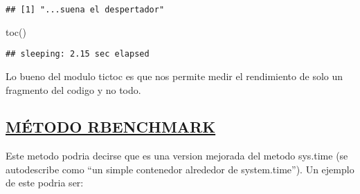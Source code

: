 \documentclass[preprint, 3p,
authoryear]{elsarticle} %
\newenvironment{Shaded}{\begin{snugshade}}{\end{snugshade}}
\newcommand{\FunctionTok}[1]{\textcolor[rgb]{0.00,0.00,0.00}{#1}}
\newcommand{\NormalTok}[1]{#1}
\begin{document}
\begin{verbatim}
## [1] "...suena el despertador"
\end{verbatim}

\begin{Shaded}
\begin{Highlighting}[]
\FunctionTok{toc}\NormalTok{()}
\end{Highlighting}
\end{Shaded}

\begin{verbatim}
## sleeping: 2.15 sec elapsed
\end{verbatim}

Lo bueno del modulo tictoc es que nos permite medir el rendimiento de
solo un fragmento del codigo y no todo.

\hypertarget{muxe9todo-rbenchmark}{%
\subsection{\texorpdfstring{\uline{\textbf{MÉTODO
RBENCHMARK}}}{MÉTODO RBENCHMARK}}\label{muxe9todo-rbenchmark}}

Este metodo podria decirse que es una version mejorada del metodo
sys.time (se autodescribe como ``un simple contenedor alrededor de
system.time''). Un ejemplo de este podria ser:
\end{document}
